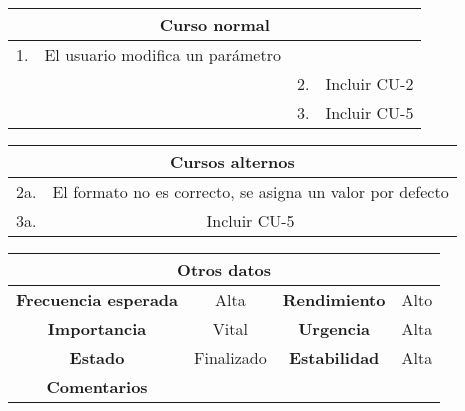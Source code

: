 \begin{table}[!h]
\begin{tabular}{|c|c|c|c|}
\hline
\multicolumn{4}{|c|}{ \cellcolor{cyan}Curso normal} \\
\hline
      1.        &  El usuario modifica un parámetro     &              &              \\
\hline
              &               &       2.       &      Incluir CU-2         \\
\hline
              &               &       3.       &      Incluir CU-5        \\

\hline
\end{tabular}
\end{table}

\begin{table}[!h]
\begin{tabular}{|c|c|}
\hline
\multicolumn{2}{|c|}{\cellcolor{cyan} \textbf{Cursos alternos}} \\
\hline
       2a.       &      El formato no es correcto, se asigna un valor por defecto        \\
\hline
       3a.       &      Incluir CU-5        \\
\hline
\end{tabular}
\end{table}

\begin{table}[!h]
\begin{tabular}{|c|c|c|c|}
\hline
\multicolumn{4}{|c|}{\cellcolor{cyan} \textbf{Otros datos}} \\
\hline
 \cellcolor{cyan} \textbf{Frecuencia esperada}             &     Alta          &    \cellcolor{cyan} \textbf{Rendimiento}          &      Alto        \\
\hline
 \cellcolor{cyan} \textbf{Importancia}             &      Vital         &     \cellcolor{cyan} \textbf{Urgencia}         &      Alta        \\
\hline
 \cellcolor{cyan} \textbf{Estado}             &      Finalizado         &    \cellcolor{cyan} \textbf{Estabilidad}          &     Alta         \\
\hline
 \cellcolor{cyan} \textbf{Comentarios}        &  \multicolumn{3}{|c|}{} \\
\hline
\end{tabular}
\end{table}





